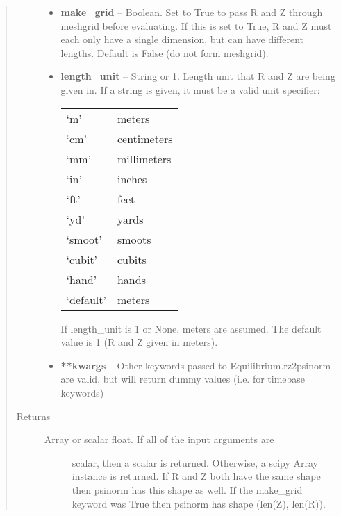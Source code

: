 \documentclass[letterpaper,10pt,english]{sphinxmanual}
\begin{document}
\begin{fulllineitems}
\begin{fulllineitems}
\begin{quote}
\begin{description}
\begin{itemize}
\item {} 
\textbf{make\_grid} -- Boolean.
Set to True to pass R and Z through meshgrid
before evaluating. If this is set to True, R and Z must each
only have a single dimension, but can have different lengths.
Default is False (do not form meshgrid).

\item {} 
\textbf{length\_unit} -- 
String or 1.
Length unit that R and Z are being given
in. If a string is given, it must be a valid unit specifier:

\begin{tabulary}{\linewidth}{|L|L|}
\hline

`m'
 & 
meters
\\

`cm'
 & 
centimeters
\\

`mm'
 & 
millimeters
\\

`in'
 & 
inches
\\

`ft'
 & 
feet
\\

`yd'
 & 
yards
\\

`smoot'
 & 
smoots
\\

`cubit'
 & 
cubits
\\

`hand'
 & 
hands
\\

`default'
 & 
meters
\\
\hline\end{tabulary}


If length\_unit is 1 or None, meters are assumed. The default
value is 1 (R and Z given in meters).


\item {} 
\textbf{**kwargs} -- Other keywords passed to Equilibrium.rz2psinorm are valid,
but will return dummy values (i.e. for timebase keywords)

\end{itemize}

\item[{Returns}] \leavevmode
\begin{description}
\item[{Array or scalar float. If all of the input arguments are}] \leavevmode
scalar, then a scalar is returned. Otherwise, a scipy Array
instance is returned. If R and Z both have the same shape then
psinorm has this shape as well. If the make\_grid keyword was
True then psinorm has shape (len(Z), len(R)).


\end{description}
\end{description}
\end{quote}
\end{fulllineitems}
\end{fulllineitems}
\end{document}
